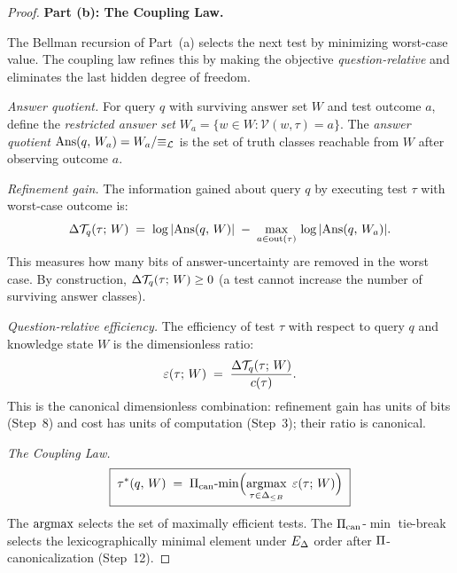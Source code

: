 \begin{proof}

\bigskip\noindent
\textbf{Part (b): The Coupling Law.}

The Bellman recursion of Part~(a) selects the next test by minimizing
worst-case value.  The coupling law refines this by making the objective
\emph{question-relative} and eliminates the last hidden degree of freedom.

\emph{Answer quotient.}  For query $q$ with surviving answer set $W$ and
test outcome $a$, define the \emph{restricted answer set}
$W_a = \{w \in W : \mathcal{V}(w, \tau) = a\}$.  The \emph{answer quotient}
$\mathrm{Ans}(q,\, W_a) = W_a / {\equiv_{\mathcal{L}}}$ is the set of truth classes reachable
from $W$ after observing outcome $a$.

\emph{Refinement gain.}  The information gained about query $q$ by
executing test $\tau$ with worst-case outcome is:
\[
  \Delta\mathcal{T}_{q}(\tau;\, W) \;=\;
  \log|\mathrm{Ans}(q,\, W)| \;-\; \max_{a \in \mathrm{out}(\tau)}\,
  \log|\mathrm{Ans}(q,\, W_a)|.
\]
This measures how many bits of answer-uncertainty are removed in the
worst case.  By construction, $\Delta\mathcal{T}_{q}(\tau;\, W) \geq 0$ (a test
cannot increase the number of surviving answer classes).

\emph{Question-relative efficiency.}  The efficiency of test $\tau$ with
respect to query $q$ and knowledge state $W$ is the dimensionless ratio:
\[
  \varepsilon(\tau;\, W) \;=\;
  \frac{\Delta\mathcal{T}_{q}(\tau;\, W)}{c(\tau)}.
\]
This is the canonical dimensionless combination: refinement gain has units
of bits (Step~8) and cost has units of computation (Step~3); their ratio
is canonical.

\emph{The Coupling Law.}
\[
  \boxed{\;
    \OptTest{q}{W} \;=\;
    \PiCanon\text{-}\!\min\Bigl(
      \argmax_{\tau \in \Del_{\leq B}}\;
      \EffQ{\tau}{W}
    \Bigr)
  \;}
\]
The $\argmax$ selects the set of maximally efficient tests.  The
$\Pi_{\mathrm{can}}$-$\min$ tie-break selects the lexicographically minimal
element under $E_\Delta$ order after $\Pi$-canonicalization (Step~12).


\end{proof}
